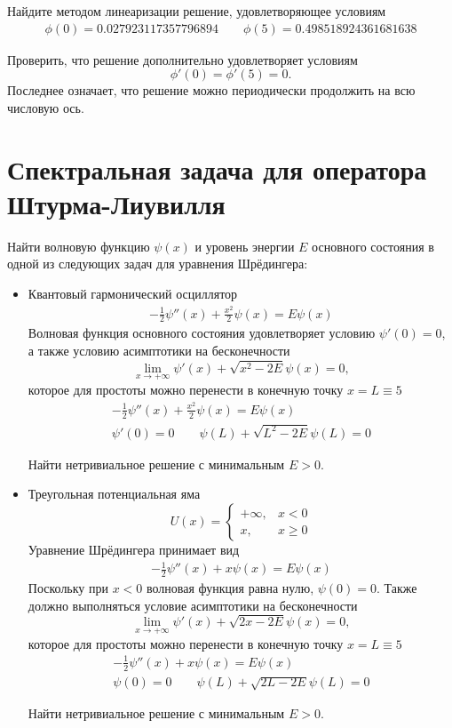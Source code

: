 \documentclass[10pt]{article}
\begin{document}
Найдите методом линеаризации решение, удовлетворяющее условиям
\begin{gather*}
\phi(0) = 0.027923117357796894 \qquad
\phi(5) = 0.498518924361681638
\end{gather*}

Проверить, что решение дополнительно удовлетворяет условиям \[\phi'(0) =
\phi'(5) = 0.\]
Последнее означает, что решение можно периодически продолжить на всю числовую
ось.

\section{Спектральная задача для оператора Штурма-Лиувилля}
Найти волновую функцию $\psi(x)$ и уровень энергии $E$ основного состояния в одной из следующих
задач для уравнения Шрёдингера:
\begin{itemize}
\item Квантовый гармонический осциллятор
\begin{gather*}
-\frac{1}{2}\psi''(x) + \frac{x^2}{2} \psi(x) = E\psi(x)
\end{gather*}
Волновая функция основного состояния удовлетворяет условию $\psi'(0) = 0$, а
также условию асимптотики на бесконечности
\[
\lim_{x\rightarrow +\infty} \psi'(x) + \sqrt{x^2 - 2E} \psi(x) = 0,
\]
которое для простоты можно перенести в конечную точку $x = L \equiv 5$
\begin{gather*}
-\frac{1}{2}\psi''(x) + \frac{x^2}{2} \psi(x) = E\psi(x)\\
\psi'(0) = 0\qquad
\psi(L) + \sqrt{L^2 - 2E} \psi(L) = 0
\end{gather*}

Найти нетривиальное решение с минимальным $E > 0$.
\item Треугольная потенциальная яма
\[
U(x) = 
\begin{cases}
+\infty, &x < 0\\
x, &x \geq 0
\end{cases}
\]
Уравнение Шрёдингера принимает вид
\begin{gather*}
-\frac{1}{2}\psi''(x) + x \psi(x) = E\psi(x)
\end{gather*}
Поскольку при $x < 0$ волновая функция равна нулю, $\psi(0) = 0$.
Также должно выполняться условие асимптотики на бесконечности
\[
\lim_{x\rightarrow +\infty} \psi'(x) + \sqrt{2x - 2E} \psi(x) = 0,
\]
которое для простоты можно перенести в конечную точку $x = L \equiv 5$
\begin{gather*}
-\frac{1}{2}\psi''(x) + x \psi(x) = E\psi(x)\\
\psi(0) = 0\qquad
\psi(L) + \sqrt{2L - 2E} \psi(L) = 0
\end{gather*}

Найти нетривиальное решение с минимальным $E > 0$.

\end{itemize}
\end{document}
